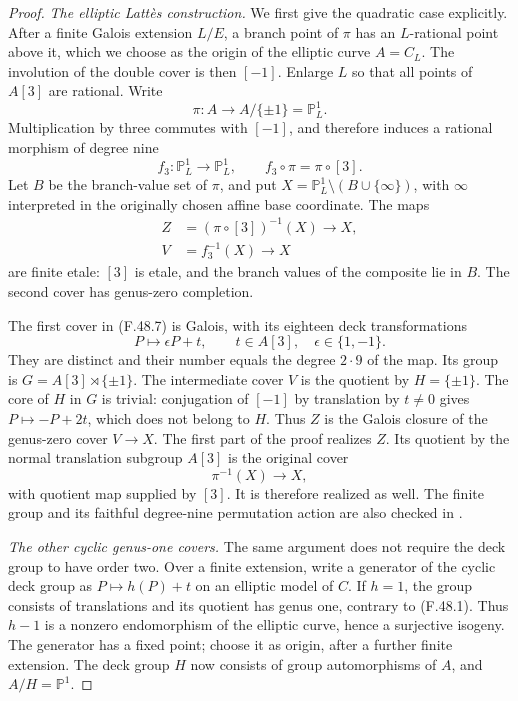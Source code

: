\documentclass[11pt]{article}
\begin{document}
\begin{proof}
\emph{The elliptic Latt\`es construction.}
We first give the quadratic case explicitly. After a
finite Galois extension \(L/E\), a branch point of
\(\pi\) has an \(L\)-rational point above it, which
we choose as the origin of the elliptic curve \(A=C_L\).
The involution of the double cover is then \([-1]\).
Enlarge \(L\) so that all points of \(A[3]\) are
rational. Write
\[
                 \pi:A\longrightarrow A/\{\pm1\}
                                      =\mathbb P^1_L.
\]
Multiplication by three commutes with \([-1]\), and
therefore induces a rational morphism of degree nine
\[
          f_3:\mathbb P^1_L\longrightarrow\mathbb P^1_L,
                 \qquad f_3\circ\pi=\pi\circ[3].
                                                        \tag{F.48.6}
\]
Let \(B\) be the branch-value set of \(\pi\), and
put \(X=\mathbb P^1_L\setminus(B\cup\{\infty\})\),
with \(\infty\) interpreted in the originally chosen
affine base coordinate. The maps
\[
 \begin{split}
  Z&=(\pi\circ[3])^{-1}(X)\longrightarrow X,\\
  V&=f_3^{-1}(X)\longrightarrow X
 \end{split}
                                                        \tag{F.48.7}
\]
are finite etale: \([3]\) is etale, and the branch
values of the composite lie in \(B\). The second
cover has genus-zero completion.

The first cover in (F.48.7) is Galois, with its
eighteen deck transformations
\[
            P\longmapsto \epsilon P+t,
             \qquad t\in A[3],\quad\epsilon\in\{1,-1\}.
                                                        \tag{F.48.8}
\]
They are distinct and their number equals the degree
\(2\cdot9\) of the map. Its group is
\(G=A[3]\rtimes\{\pm1\}\). The intermediate
cover \(V\) is the quotient by
\(H=\{\pm1\}\). The core of \(H\) in \(G\)
is trivial: conjugation of \([-1]\) by translation
by \(t\ne0\) gives \(P\mapsto-P+2t\), which
does not belong to \(H\). Thus \(Z\) is the
Galois closure of the genus-zero cover \(V\to X\).
The first part of the proof realizes \(Z\).
Its quotient by the normal translation subgroup
\(A[3]\) is the original cover
\[
               \pi^{-1}(X)\longrightarrow X,
                                                        \tag{F.48.9}
\]
with quotient map supplied by \([3]\). It is therefore
realized as well. The finite group and its faithful
degree-nine permutation action are also checked in
.

\emph{The other cyclic genus-one covers.}
The same argument does not require the deck group to
have order two. Over a finite extension, write a
generator of the cyclic deck group as
\(P\mapsto h(P)+t\) on an elliptic model of \(C\).
If \(h=1\), the group consists of translations and
its quotient has genus one, contrary to (F.48.1).
Thus \(h-1\) is a nonzero endomorphism of the elliptic
curve, hence a surjective isogeny. The generator has
a fixed point; choose it as origin, after a further
finite extension. The deck group \(H\) now consists
of group automorphisms of \(A\), and
\(A/H=\mathbb P^1\).


\end{proof}
\end{document}
